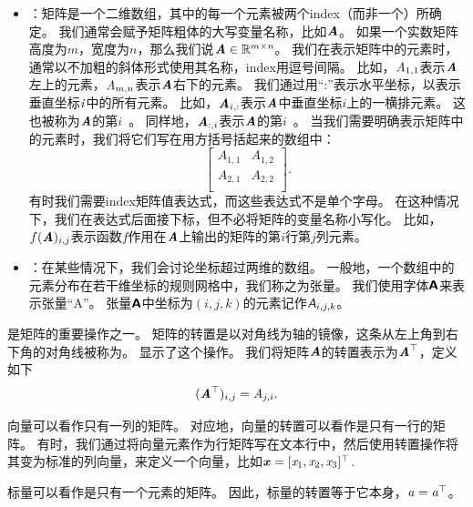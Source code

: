 \begin{itemize}
    \item {}：矩阵是一个二维数组，其中的每一个元素被两个\gls{index}（而非一个）所确定。
    我们通常会赋予矩阵粗体的大写变量名称，比如$\boldsymbol{\mathit{A}}$。
    如果一个实数矩阵高度为$m$，宽度为$n$，那么我们说$\boldsymbol{\mathit{A}}\in \mathbb{R}^{m\times n}$。
    我们在表示矩阵中的元素时，通常以不加粗的斜体形式使用其名称，\gls{index}用逗号间隔。
    比如，$\mathit{A}_{1,1}$表示$\boldsymbol{\mathit{A}}$左上的元素，$\mathit{A}_{m,n}$表示$\boldsymbol{\mathit{A}}$右下的元素。
    我们通过用``:''表示水平坐标，以表示垂直坐标$\mathit{i}$中的所有元素。
    比如，$\boldsymbol{\mathit{A}}_{i,:}$表示$\boldsymbol{\mathit{A}}$中垂直坐标$i$上的一横排元素。
    这也被称为$\boldsymbol{\mathit{A}}$的第$i$~。
    同样地，$\boldsymbol{\mathit{A}}_{:,i}$表示$\boldsymbol{\mathit{A}}$的第$i$~。
    当我们需要明确表示矩阵中的元素时，我们将它们写在用方括号括起来的数组中：
    \begin{equation}
        \begin{bmatrix}
            A_{1,1} & A_{1,2} \\
            A_{2,1} & A_{2,2} \\
        \end{bmatrix}.
    \end{equation}
    有时我们需要\gls{index}矩阵值表达式，而这些表达式不是单个字母。
    在这种情况下，我们在表达式后面接下标，但不必将矩阵的变量名称小写化。
    比如，$f(\boldsymbol{\mathit{A}})_{i,j}$表示函数$f$作用在$\boldsymbol{\mathit{A}}$上输出的矩阵的第$i$行第$j$列元素。


    \item {}：在某些情况下，我们会讨论坐标超过两维的数组。
    一般地，一个数组中的元素分布在若干维坐标的规则网格中，我们称之为张量。
    我们使用字体$\textsf{\textbf{A}}$来表示张量``A''。
    张量$\textsf{\textbf{A}}$中坐标为$(i,j,k)$的元素记作$\textit{\textsf{A}}_{i,j,k}$。
\end{itemize}


是矩阵的重要操作之一。
矩阵的转置是以对角线为轴的镜像，这条从左上角到右下角的对角线被称为。
显示了这个操作。
我们将矩阵$\boldsymbol{\mathit{A}}$的转置表示为$\boldsymbol{\mathit{A}}^\top$，定义如下
\begin{equation}
(\boldsymbol{\mathit{A}}^\top)_{i,j}= \mathit{A}_{j,i}.
\end{equation}

向量可以看作只有一列的矩阵。
对应地，向量的转置可以看作是只有一行的矩阵。
有时，我们通过将向量元素作为行矩阵写在文本行中，然后使用转置操作将其变为标准的列向量，来定义一个向量，比如$\boldsymbol{\mathit{x}}=[\mathit{x}_1, \mathit{x}_2, \mathit{x}_3]^\top$.


标量可以看作是只有一个元素的矩阵。
因此，标量的转置等于它本身，$\mathit{a}=\mathit{a}^\top$。

